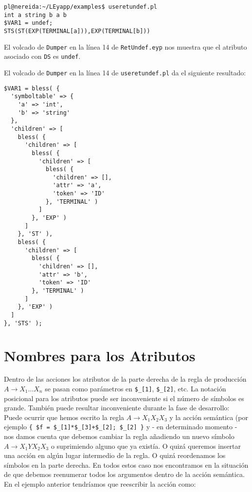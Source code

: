 \begin{verbatim}
pl@nereida:~/LEyapp/examples$ useretundef.pl
int a string b a b
$VAR1 = undef;
STS(ST(EXP(TERMINAL[a])),EXP(TERMINAL[b]))
\end{verbatim}
El volcado de \verb|Dumper| en la línea 14 de \verb|RetUndef.eyp|
nos muestra que el atributo asociado con \verb|DS| es \verb|undef|.

El volcado de \verb|Dumper| en la línea 14 de \verb|useretundef.pl|
da el siguiente resultado:
\begin{verbatim}
$VAR1 = bless( {
  'symboltable' => {
    'a' => 'int',
    'b' => 'string'
  },
  'children' => [
    bless( {
      'children' => [
        bless( {
          'children' => [
            bless( {
              'children' => [],
              'attr' => 'a',
              'token' => 'ID'
            }, 'TERMINAL' )
          ]
        }, 'EXP' )
      ]
    }, 'ST' ),
    bless( {
      'children' => [
        bless( {
          'children' => [],
          'attr' => 'b',
          'token' => 'ID'
        }, 'TERMINAL' )
      ]
    }, 'EXP' )
  ]
}, 'STS' );
\end{verbatim}

\section{Nombres para los Atributos}
\label{section:eyappejemplodeuso}


Dentro de las acciones los atributos de la parte derecha de la regla de producción
$A \rightarrow X_1 \ldots X_n$
se pasan como parámetros en \verb|$_[1]|, \verb|$_[2]|, etc.
La notación posicional para los atributos puede ser inconveniente si el número de símbolos es grande.
También puede resultar inconveniente durante la fase de desarrollo: 
Puede ocurrir que hemos escrito la regla  $A \rightarrow X_1 X_2 X_3$
y la acción semántica (por ejemplo \verb|{ $f = $_[1]*$_[3]+$_[2]; $_[2] }|
y - en determinado momento - nos damos cuenta que debemos cambiar la regla añadiendo
un nuevo símbolo $A \rightarrow X_1 Y X_2 X_3$ o suprimiendo alguno que ya existía. 
O quizá queremos insertar una
acción en algún lugar intermedio de la regla. O quizá reordenamos los símbolos en
la parte derecha. En todos estos caso nos encontramos en la 
situación de que debemos reenumerar todos los argumentos dentro de la acción
semántica. En el ejemplo anterior tendríamos que reescribir la acción como:



